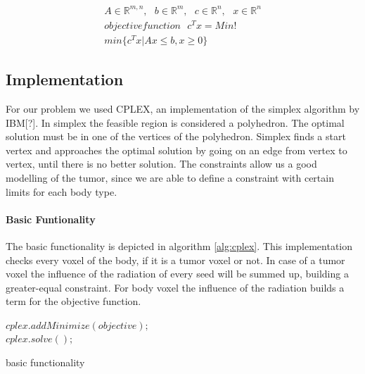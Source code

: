 \documentclass[12pt]{article}
\begin{document}
 \begin{equation}
 \label{eq:LPMatrix}
 \begin{aligned}
 A \in \mathbb{R}^{m,n}, \ \ \ b \in \mathbb{R}^m, \ \ \ c \in \mathbb{R}^n, \ \ \ x \in \mathbb{R}^n \\
 objective function \ \ \ c^Tx = Min! \\
 min\{c^Tx|Ax \leq b, x \geq 0\}
\end{aligned}
 \end{equation}
 
 
 
 \subsection{Implementation}
 
For our problem we used CPLEX, an implementation of the simplex algorithm by IBM[?]. In simplex the feasible region is considered a polyhedron. The optimal solution must be in one of the vertices of the polyhedron. Simplex finds a start vertex and approaches the optimal solution by going on an edge from vertex to vertex, until there is no better solution.
The constraints allow us a good modelling of the tumor, since we are able to define a constraint with certain limits for each body type.

\paragraph{Basic Funtionality}
The basic functionality is depicted in algorithm \ref{alg:cplex}. This implementation checks every voxel of the body, if it is a tumor voxel or not. In case of a tumor voxel the influence of the radiation of every seed will be summed up, building a greater-equal constraint. For body voxel the influence of the radiation builds a term for the objective function. 
\begin{algorithm}[H]
\label{alg:cplex}
  $cplex.addMinimize(objective);$\\
  $cplex.solve();$
 \caption{basic functionality}
 \end{algorithm}
\end{document}
